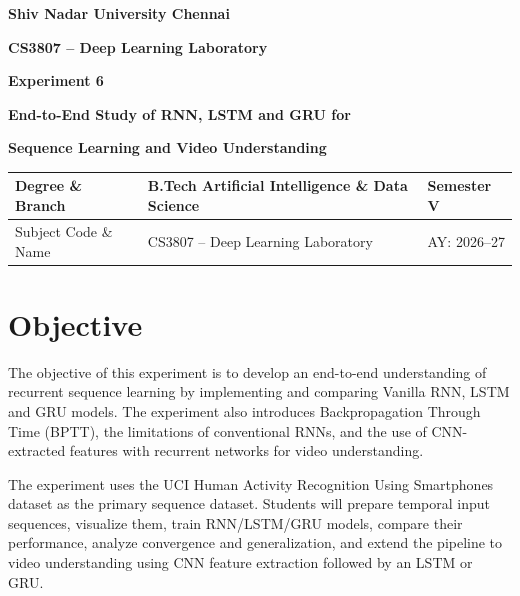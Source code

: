 \documentclass[10pt]{article}
\begin{document}

\begin{center}

{\large\textbf{Shiv Nadar University Chennai}}

\vspace{2mm}

{\normalsize\textbf{CS3807 -- Deep Learning Laboratory}}

\vspace{2mm}

{\large\textbf{Experiment 6}}

\vspace{1mm}

{\normalsize\textbf{End-to-End Study of RNN, LSTM and GRU for}}

{\normalsize\textbf{Sequence Learning and Video Understanding}}

\end{center}

\vspace{3mm}

\begin{tabular}{|p{3.4cm}|p{9.0cm}|p{1.4cm}|}
\hline
Degree \& Branch &
B.Tech Artificial Intelligence \& Data Science &
Semester V\\
\hline
Subject Code \& Name &
CS3807 -- Deep Learning Laboratory &
AY: 2026--27\\
\hline
\end{tabular}

\section{Objective}

The objective of this experiment is to develop an end-to-end understanding of
recurrent sequence learning by implementing and comparing Vanilla RNN, LSTM
and GRU models. The experiment also introduces Backpropagation Through Time
(BPTT), the limitations of conventional RNNs, and the use of CNN-extracted
features with recurrent networks for video understanding.

The experiment uses the UCI Human Activity Recognition Using Smartphones
dataset as the primary sequence dataset. Students will prepare temporal input
sequences, visualize them, train RNN/LSTM/GRU models, compare their
performance, analyze convergence and generalization, and extend the pipeline
to video understanding using CNN feature extraction followed by an LSTM or
GRU.
\end{document}
